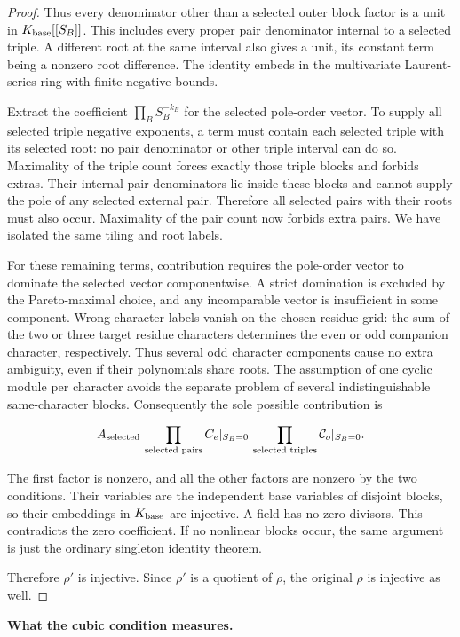 \begin{proof}
Thus every denominator other than a selected outer block factor is a unit in \(K_{\rm base}[[S_B]]\). This includes every proper pair denominator internal to a selected triple. A different root at the same interval also gives a unit, its constant term being a nonzero root difference. The identity embeds in the multivariate Laurent-series ring with finite negative bounds.

Extract the coefficient \(\prod_B S_B^{-k_B}\) for the selected pole-order vector. To supply all selected triple negative exponents, a term must contain each selected triple with its selected root: no pair denominator or other triple interval can do so. Maximality of the triple count forces exactly those triple blocks and forbids extras. Their internal pair denominators lie inside these blocks and cannot supply the pole of any selected external pair. Therefore all selected pairs with their roots must also occur. Maximality of the pair count now forbids extra pairs. We have isolated the same tiling and root labels.

For these remaining terms, contribution requires the pole-order vector to dominate the selected vector componentwise. A strict domination is excluded by the Pareto-maximal choice, and any incomparable vector is insufficient in some component. Wrong character labels vanish on the chosen residue grid: the sum of the two or three target residue characters determines the even or odd companion character, respectively. Thus several odd character components cause no extra ambiguity, even if their polynomials share roots. The assumption of one cyclic module per character avoids the separate problem of several indistinguishable same-character blocks. Consequently the sole possible contribution is

\[
A_{\rm selected}\,
\prod_{\text{selected pairs}}C_e|_{S_B=0}\,
\prod_{\text{selected triples}}\mathcal C_o|_{S_B=0}.
\]

The first factor is nonzero, and all the other factors are nonzero by the two conditions. Their variables are the independent base variables of disjoint blocks, so their embeddings in \(K_{\rm base}\) are injective. A field has no zero divisors. This contradicts the zero coefficient. If no nonlinear blocks occur, the same argument is just the ordinary singleton identity theorem.

Therefore \(\rho'\) is injective. Since \(\rho'\) is a quotient of \(\rho\), the original \(\rho\) is injective as well.

\end{proof}
\par\medskip\noindent\textbf{What the cubic condition measures.}

